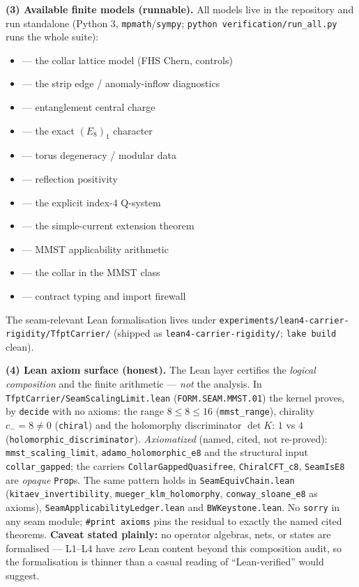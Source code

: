\documentclass[11pt,a4paper]{article}
\begin{document}
\par\smallskip\noindent\textbf{(3) Available finite models (runnable).} All models live in the
repository and run standalone (Python 3, \texttt{mpmath}/\texttt{sympy}; \texttt{python
verification/run\_all.py} runs the whole suite):
\begin{itemize}
\item {} --- the collar lattice model (FHS Chern, controls)
\item {} --- the strip edge / anomaly-inflow diagnostics
\item {} --- entanglement central charge
\item {} --- the exact $(E_8)_1$ character
\item {} --- torus degeneracy / modular data
\item {} --- reflection positivity
\item {} --- the explicit index-$4$ Q-system
\item {} --- the simple-current extension theorem
\item {} --- MMST applicability arithmetic
\item {} --- the collar in the MMST class
\item {} --- contract typing and import firewall
\end{itemize}
The seam-relevant Lean formalisation lives under
\texttt{experiments/\allowbreak lean4-carrier-rigidity/\allowbreak TfptCarrier/} (shipped as
\texttt{lean4-carrier-rigidity/}; \texttt{lake build} clean).

\par\smallskip\noindent\textbf{(4) Lean axiom surface (honest).} The Lean layer certifies the
\emph{logical composition} and the finite arithmetic --- \emph{not} the analysis. In
\texttt{TfptCarrier/SeamScalingLimit.lean} (\texttt{FORM.SEAM.MMST.01}) the kernel proves, by
\texttt{decide} with no axioms: the range $8\le8\le16$ (\texttt{mmst\_range}), chirality
$c_-=8\neq0$ (\texttt{chiral}) and the holomorphy discriminator $\det K$: $1$ vs $4$
(\texttt{holomorphic\_discriminator}). \emph{Axiomatized} (named, cited, not re-proved):
\texttt{mmst\_scaling\_limit}, \texttt{adamo\_holomorphic\_e8} and the structural input
\texttt{collar\_gapped}; the carriers \texttt{CollarGappedQuasifree}, \texttt{ChiralCFT\_c8},
\texttt{SeamIsE8} are \emph{opaque} \texttt{Prop}s. The same pattern holds in
\texttt{SeamEquivChain.lean} (\texttt{kitaev\_invertibility}, \texttt{mueger\_klm\_holomorphy},
\texttt{conway\_sloane\_e8} as axioms), \texttt{SeamApplicabilityLedger.lean} and
\texttt{BWKeystone.lean}. No \texttt{sorry} in any seam module; \texttt{\#print axioms} pins the
residual to exactly the named cited theorems. \textbf{Caveat stated plainly:} no operator
algebras, nets, or states are formalised --- L1--L4 have \emph{zero} Lean content beyond this
composition audit, so the formalisation is thinner than a casual reading of ``Lean-verified''
would suggest.
\end{document}
